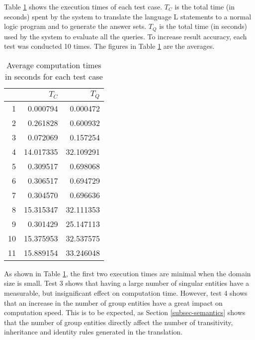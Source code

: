 \documentclass[global,twocolumn,final]{svjour}
\begin{document}
      Table \ref{tab-2} shows the execution times of each test case. $T_{C}$ is
      the total time (in seconds) spent by the system to translate the language
      {\cal L} statements to a normal logic program and to generate the answer
      sets. $T_{Q}$ is the total time (in seconds) used by the system to
      evaluate all the queries. To increase result accuracy, each test was
      conducted 10 times. The figures in Table \ref{tab-2} are the averages.

      \begin{table}[ht]
        \begin{center}
          \begin{tabular}[t]{|r|r|r|}
            \hline
            &
            \textbf{$T_{C}$} &
            \textbf{$T_{Q}$} \\
            \hline
            1 & 0.000794 & 0.000472 \\
            \hline
            2 & 0.261828  & 0.600932 \\
            \hline
            3 & 0.072069 & 0.157254 \\
            \hline
            4 & 14.017335 & 32.109291 \\
            \hline
            5 & 0.309517 & 0.698068 \\
            \hline
            6 & 0.306517 & 0.694729 \\
            \hline
            7 & 0.304570 & 0.696636 \\
            \hline
            8 & 15.315347 & 32.111353 \\
            \hline
            9 & 0.301429 & 25.147113 \\
            \hline
            10 & 15.375953 & 32.537575 \\
            \hline
            11 & 15.889154 & 33.246048 \\
            \hline
          \end{tabular}
        \end{center}
        \caption[]{Average computation times in seconds for each test case}
        \label{tab-2}
      \end{table}

      As shown in Table \ref{tab-2}, the first two execution times are minimal
      when the domain size is small. Test 3 shows that having a large number of
      singular entities have a measurable, but insignificant effect on
      computation time. However, test 4 shows that an increase in the number of
      group entities have a great impact on computation speed. This is to be
      expected, as Section \ref{subsec-semantics} shows that the number of group
      entities directly affect the number of transitivity, inheritance and
      identity rules generated in the translation.
\end{document}
